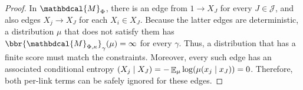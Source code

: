 \documentclass[letterpaper]{article} %
\theoremstyle{plain}
\theoremstyle{definition}
\theoremstyle{remark}
\let\H\relax
\DeclareMathOperator{\H}{\mathrm{H}} %
\DeclareMathOperator*{\Ex}{\mathbb{E}} %
\newcommand{\dg}[1]{\mathbdcal{#1}}
\newcommand{\PDGof}[1]{{\dg M}_{#1}}
\begin{document}
\begin{proof}
  In $\PDGof{\Phi}$, there is an edge from $1 \to X_J$ for every $J
  \in \mathcal J$, and also edges $X_j \to X_J$ for each $X_i
    \in X_J$. Because the latter edges are deterministic, a
        distribution $\mu$ that does not satisfy them has $\bbr{\dg
M_{\Phi,\kappa}}_\gamma(\mu) = \infty$ for every $\gamma$.
          Thus, a distribution that 
        has a finite score must match the constraints. Moreover, every
        such edge has an associated conditional entropy $\H(X_j \mid
        X_J) = -\Ex_\mu\log(\mu(x_j \mid x_J)) = 0$. Therefore, both
        per-link terms can be safely ignored for these edges. 


\end{proof}
\end{document}
